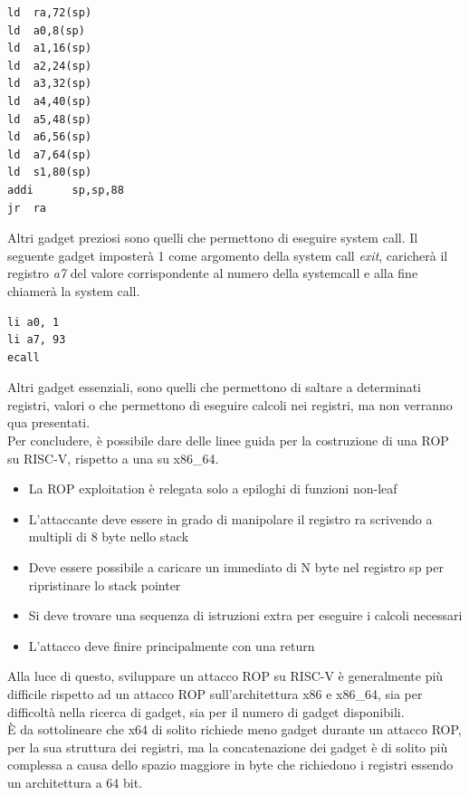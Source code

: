 \begin{verbatim}
ld	ra,72(sp)
ld	a0,8(sp)
ld	a1,16(sp)
ld	a2,24(sp)
ld	a3,32(sp)
ld	a4,40(sp)
ld	a5,48(sp)
ld	a6,56(sp)
ld	a7,64(sp)
ld	s1,80(sp)
addi      sp,sp,88
jr	ra
\end{verbatim}
Altri gadget preziosi sono quelli che permettono di eseguire system call. Il seguente gadget imposterà 1 come argomento della system call \textit{exit}, caricherà il registro \textit{a7} del valore corrispondente al numero della systemcall e alla fine chiamerà la system call.
\begin{verbatim}
li a0, 1
li a7, 93
ecall
\end{verbatim}
Altri gadget essenziali, sono quelli che permettono di saltare a determinati registri, valori o che permettono di eseguire calcoli nei registri, ma non verranno qua presentati.\\
Per concludere, è possibile dare delle linee guida per la costruzione di una ROP su RISC-V, rispetto a una su x86\_64.
\begin{itemize}
    \item La ROP exploitation è relegata solo a epiloghi di funzioni non-leaf
    \item L'attaccante deve essere in grado di manipolare il registro ra scrivendo a multipli di 8 byte nello stack
    \item Deve essere possibile a caricare un immediato di N byte nel registro sp per ripristinare lo stack pointer
    \item Si deve trovare una sequenza di istruzioni extra per eseguire i calcoli necessari
    \item L'attacco deve finire principalmente con una return
\end{itemize}
Alla luce di questo, sviluppare un attacco ROP su RISC-V è generalmente più difficile rispetto ad un attacco ROP sull'architettura x86 e x86\_64, sia per difficoltà nella ricerca di gadget, sia per il numero di gadget disponibili.\\
È da sottolineare che x64 di solito richiede meno gadget durante un attacco ROP, per la sua struttura dei registri, ma la concatenazione dei gadget è di solito più complessa a causa dello spazio maggiore in byte che richiedono i registri essendo un architettura a 64 bit. 
